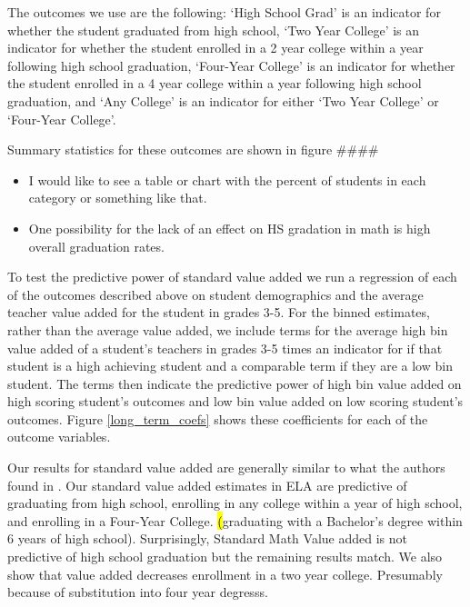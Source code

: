 \documentclass{article}
\theoremstyle{definition}
\theoremstyle{definition}
\theoremstyle{definition}
\theoremstyle{definition}
\begin{document}
The outcomes we use are the following: `High School Grad' is an indicator for whether the student graduated from high school, `Two Year College' is an indicator for whether the student enrolled in a 2 year college within a year following high school graduation, `Four-Year College' is an indicator for whether the student enrolled in a 4 year college within a year following high school graduation, and `Any College' is an indicator for either `Two Year College' or `Four-Year College'. 

Summary statistics for these outcomes are shown in figure #### 
\begin{itemize}
    \item I would like to see a table or chart with the percent of students in each category or something like that. 
    \item One possibility for the lack of an effect on HS gradation in math is high overall graduation rates. 
\end{itemize}

To test the predictive power of standard value added we run a regression of each of the outcomes described above on student demographics and the average teacher value added for the student in grades 3-5. For the binned estimates, rather than the average value added, we include terms for the average high bin value added of a student's teachers in grades 3-5 times an indicator for if that student is a high achieving student and a comparable term if they are a low bin student. The terms then indicate the predictive power of high bin value added on high scoring student's outcomes and low bin value added on low scoring student's outcomes. Figure \ref{long_term_coefs} shows these coefficients for each of the outcome variables. 


Our results for standard value added are generally similar to what the authors found in \cite{chetty2014measuring2}. Our standard value added estimates in ELA are predictive of graduating from high school, enrolling in any college within a year of high school, and  enrolling in a Four-Year College. \hl(graduating with a Bachelor's degree within 6 years of high school). Surprisingly, Standard Math Value added is not predictive of high school graduation but the remaining results match. We also show that value added decreases enrollment in a two year college. Presumably because of substitution into four year degresss. 
\end{document}
